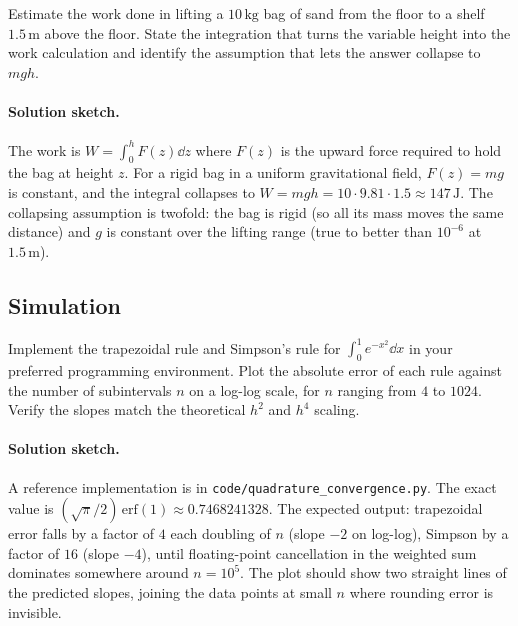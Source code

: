 \begin{exercise}
Estimate the work done in lifting a $10\,\si{\kilogram}$ bag of
sand from the floor to a shelf $1.5\,\si{\meter}$ above the floor.
State the integration that turns the variable height into the work
calculation and identify the assumption that lets the answer
collapse to $m g h$.
\end{exercise}

\paragraph{Solution sketch.}
The work is $W = \int_{0}^{h} F(z) \dd z$ where $F(z)$ is the
upward force required to hold the bag at height $z$. For a rigid
bag in a uniform gravitational field, $F(z) = m g$ is constant,
and the integral collapses to $W = m g h = 10 \cdot 9.81 \cdot
1.5 \approx 147\,\text{J}$. The collapsing assumption is twofold:
the bag is rigid (so all its mass moves the same distance) and
$g$ is constant over the lifting range (true to better than
$10^{-6}$ at $1.5\,\text{m}$).

\subsection*{Simulation}

\begin{exercise}
Implement the trapezoidal rule and Simpson's rule for
$\int_{0}^{1} e^{-x^{2}} \dd x$ in your preferred programming
environment. Plot the absolute error of each rule against the
number of subintervals $n$ on a log-log scale, for $n$ ranging
from $4$ to $1024$. Verify the slopes match the theoretical
$h^{2}$ and $h^{4}$ scaling.
\end{exercise}

\paragraph{Solution sketch.}
A reference implementation is in
\texttt{code/quadrature\_convergence.py}. The exact value is
$(\sqrt{\pi}/2)\,\mathrm{erf}(1) \approx 0.7468241328$. The
expected output: trapezoidal error falls by a factor of $4$ each
doubling of $n$ (slope $-2$ on log-log), Simpson by a factor of
$16$ (slope $-4$), until floating-point cancellation in the
weighted sum dominates somewhere around $n = 10^{5}$. The plot
should show two straight lines of the predicted slopes, joining
the data points at small $n$ where rounding error is invisible.

